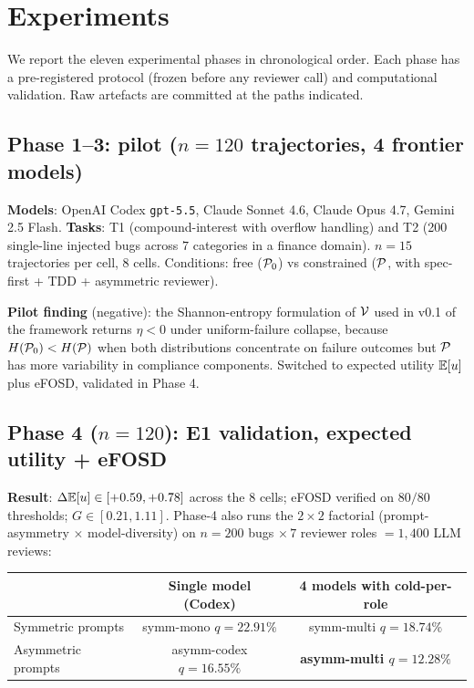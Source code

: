 \section{Experiments}
\label{sec:experiments}

We report the eleven experimental phases in chronological order. Each phase has a pre-registered protocol (frozen before any reviewer call) and computational validation. Raw artefacts are committed at the paths indicated.

\subsection{Phase 1--3: pilot ($n = 120$ trajectories, 4 frontier models)}
\label{sec:phase1-3}

\textbf{Models}: OpenAI Codex \texttt{gpt-5.5}, Claude Sonnet 4.6, Claude Opus 4.7, Gemini 2.5 Flash. \textbf{Tasks}: T1 (compound-interest with overflow handling) and T2 (200 single-line injected bugs across $7$ categories in a finance domain). $n = 15$ trajectories per cell, $8$ cells. Conditions: free ($\mathcal{P}_0$) vs constrained ($\mathcal{P}$, with spec-first + TDD + asymmetric reviewer).

\textbf{Pilot finding} (negative): the Shannon-entropy formulation of $\mathcal{V}$ used in v0.1 of the framework returns $\eta < 0$ under uniform-failure collapse, because $H(\mathcal{P}_0) < H(\mathcal{P})$ when both distributions concentrate on failure outcomes but $\mathcal{P}$ has more variability in compliance components. Switched to expected utility $\mathbb{E}[u]$ plus eFOSD, validated in Phase 4.

\subsection{Phase 4 ($n = 120$): E1 validation, expected utility + eFOSD}
\label{sec:phase4}

\textbf{Result}: $\Delta\mathbb{E}[u] \in [+0.59, +0.78]$ across the $8$ cells; eFOSD verified on $80/80$ thresholds; $G \in [0.21, 1.11]$. Phase-4 also runs the $2 \times 2$ factorial (prompt-asymmetry $\times$ model-diversity) on $n = 200$ bugs $\times\, 7$ reviewer roles $= 1{,}400$ LLM reviews:

\begin{center}
\small
\begin{tabular}{@{}lcc@{}}
\toprule
 & Single model (Codex) & 4 models with cold-per-role \\
\midrule
Symmetric prompts & symm-mono $q = 22.91\%$ & symm-multi $q = 18.74\%$ \\
Asymmetric prompts & asymm-codex $q = 16.55\%$ & \textbf{asymm-multi $q = 12.28\%$} \\
\bottomrule
\end{tabular}
\end{center}

